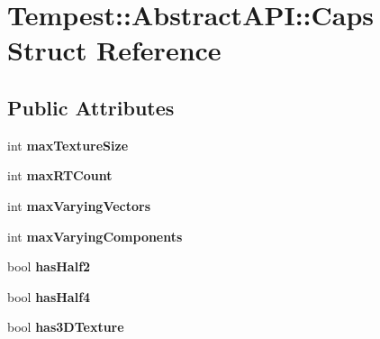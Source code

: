 \hypertarget{struct_tempest_1_1_abstract_a_p_i_1_1_caps}{\section{Tempest\+:\+:Abstract\+A\+P\+I\+:\+:Caps Struct Reference}
\label{struct_tempest_1_1_abstract_a_p_i_1_1_caps}
}
\subsection*{Public Attributes}
\begin{DoxyCompactItemize}
\item 
\hypertarget{struct_tempest_1_1_abstract_a_p_i_1_1_caps_a8651f8e59059284d19e9bf8bf8bd92af}{int {\bfseries max\+Texture\+Size}}\label{struct_tempest_1_1_abstract_a_p_i_1_1_caps_a8651f8e59059284d19e9bf8bf8bd92af}

\item 
\hypertarget{struct_tempest_1_1_abstract_a_p_i_1_1_caps_aacf8c01ce6c88cb6e7cee01e65860ff3}{int {\bfseries max\+R\+T\+Count}}\label{struct_tempest_1_1_abstract_a_p_i_1_1_caps_aacf8c01ce6c88cb6e7cee01e65860ff3}

\item 
\hypertarget{struct_tempest_1_1_abstract_a_p_i_1_1_caps_a6bd176798eb3d9379b3437cb646c4bd2}{int {\bfseries max\+Varying\+Vectors}}\label{struct_tempest_1_1_abstract_a_p_i_1_1_caps_a6bd176798eb3d9379b3437cb646c4bd2}

\item 
\hypertarget{struct_tempest_1_1_abstract_a_p_i_1_1_caps_a9326d1499426d98a4811a712fb147a27}{int {\bfseries max\+Varying\+Components}}\label{struct_tempest_1_1_abstract_a_p_i_1_1_caps_a9326d1499426d98a4811a712fb147a27}

\item 
\hypertarget{struct_tempest_1_1_abstract_a_p_i_1_1_caps_a9b4d24f75da14d595004d3b631dfe72c}{bool {\bfseries has\+Half2}}\label{struct_tempest_1_1_abstract_a_p_i_1_1_caps_a9b4d24f75da14d595004d3b631dfe72c}

\item 
\hypertarget{struct_tempest_1_1_abstract_a_p_i_1_1_caps_af947c21a33308ced2bd40c2e35f22b7b}{bool {\bfseries has\+Half4}}\label{struct_tempest_1_1_abstract_a_p_i_1_1_caps_af947c21a33308ced2bd40c2e35f22b7b}

\item 
\hypertarget{struct_tempest_1_1_abstract_a_p_i_1_1_caps_a7ec5d9b3401454081497430d62e3aac9}{bool {\bfseries has3\+D\+Texture}}\label{struct_tempest_1_1_abstract_a_p_i_1_1_caps_a7ec5d9b3401454081497430d62e3aac9}


\end{DoxyCompactItemize}
